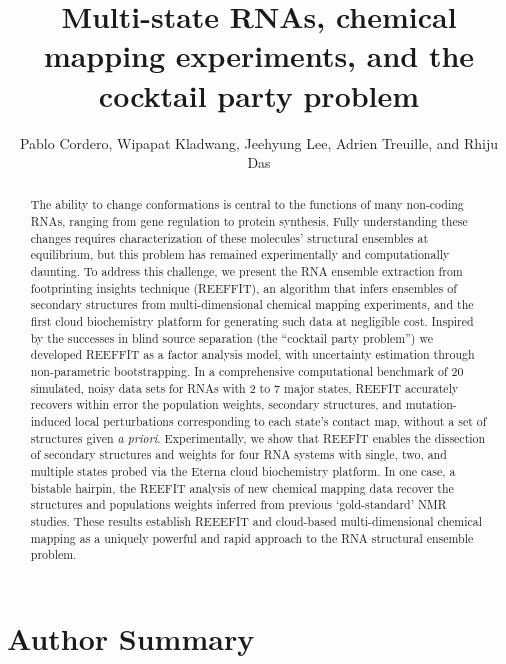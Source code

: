 \documentclass[12pt]{article}
\title{Multi-state RNAs, chemical mapping experiments, and the cocktail party problem}
\author{Pablo Cordero, Wipapat Kladwang, Jeehyung Lee, Adrien Treuille, and Rhiju Das}
\begin{document}
\maketitle

\begin{abstract}
The ability to change conformations is central to the functions of many non-coding RNAs, ranging from gene regulation to protein synthesis. 
Fully understanding these changes requires characterization of these molecules' structural ensembles at equilibrium, but this problem has remained experimentally and computationally daunting. 
To address this challenge, we present the RNA ensemble extraction from footprinting insights technique (REEFFIT), an algorithm that infers ensembles of secondary structures from multi-dimensional chemical mapping experiments, and the first cloud biochemistry platform for generating such data at negligible cost. 
Inspired by the successes in blind source separation (the ``cocktail party problem'') we developed REEFFIT as a factor analysis model, with uncertainty estimation through non-parametric bootstrapping. 
In a comprehensive computational benchmark of 20 simulated, noisy data sets for RNAs with 2 to 7 major states, REEFIT accurately recovers within error the population weights, secondary structures, and mutation-induced local perturbations corresponding to each state's contact map, without a set of structures given \textit{a priori}. 
Experimentally, we show that REEFIT enables the dissection of secondary structures and weights for four RNA systems with single, two, and multiple states probed via the Eterna cloud biochemistry platform. In one case, a bistable hairpin, the REEFIT analysis of new chemical mapping data recover the structures and populations weights inferred from previous `gold-standard' NMR studies. 
These results establish REEEFIT and cloud-based multi-dimensional chemical mapping as a uniquely powerful and rapid approach to the RNA structural ensemble problem.
\end{abstract}

\section{Author Summary}
\end{document}
